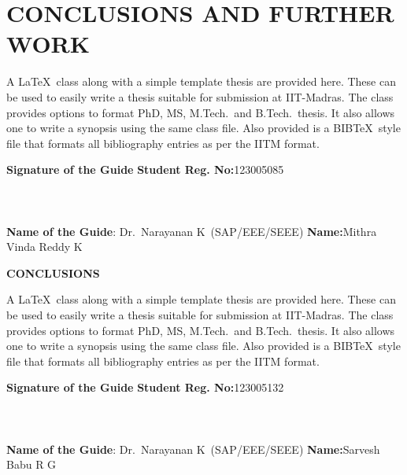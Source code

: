 	\chapter{CONCLUSIONS AND FURTHER WORK}
	\label{chap:conclusion}
	
		\noindent A \LaTeX\ class along with a simple template thesis are provided here.  These can be used to easily write a thesis suitable for submission at IIT-Madras.  The class provides options to format PhD, MS, M.Tech.\ and B.Tech.\ thesis.  It also allows one to write a synopsis using the same class file.  Also provided is a BIB\TeX\ style file that formats all bibliography entries as per the IITM format.
	
	
	
	\vspace*{24pt}
	
	\noindent \textbf{Signature of the Guide} \hspace*{70mm} \textbf{Student Reg. No:}123005085\\
		\\
	\\
	\\
\noindent \textbf{Name of the Guide}:{ Dr.~Narayanan K}~(SAP/EEE/SEEE) \hspace*{7mm} \textbf{Name:}Mithra Vinda Reddy K
\pagebreak
	\pagebreak
	

	\begin{center}
		\Large{{\textbf{CONCLUSIONS}}}
	\end{center}
	
		\noindent A \LaTeX\ class along with a simple template thesis are provided here.  These can be used to easily write a thesis suitable for submission at IIT-Madras.  The class provides options to format PhD, MS, M.Tech.\ and B.Tech.\ thesis.  It also allows one to write a synopsis using the same class file.  Also provided is a BIB\TeX\ style file that formats all bibliography entries as per the IITM format.
	
	\vspace*{24pt}
	
	\noindent \textbf{Signature of the Guide} \hspace*{70mm} \textbf{Student Reg. No:}123005132\\
		\\
	\\
	\\
\noindent \textbf{Name of the Guide}:{ Dr.~Narayanan K}~(SAP/EEE/SEEE) \hspace*{12.5 mm} \textbf{Name:}Sarvesh Babu R G
\pagebreak
	\pagebreak
	

